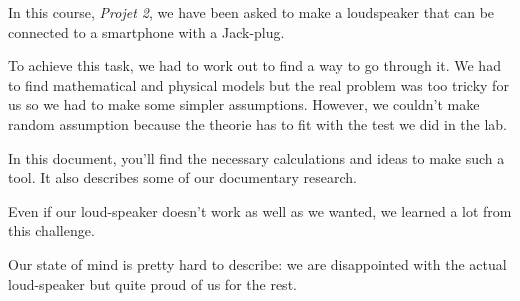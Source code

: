 

\begin{abstract-en}

In this course, \textit{Projet 2}, we have been asked to make a loudspeaker that can be connected to a smartphone with a Jack-plug.

To achieve this task, we had to work out to find a way to go through it.
We had to find mathematical and physical models but the real problem was too tricky for us so we had to make some simpler assumptions.
However, we couldn't make random assumption because the theorie has to fit with the test we did in the lab.

In this document, you'll find the necessary calculations and ideas to make such a tool. It also describes some
of our documentary research.

Even if our loud-speaker doesn't work as well as we wanted, we learned a lot from this challenge. 

Our state of mind is pretty hard to describe: we are disappointed with the actual loud-speaker but quite proud of us for the rest.

\end{abstract-en}


